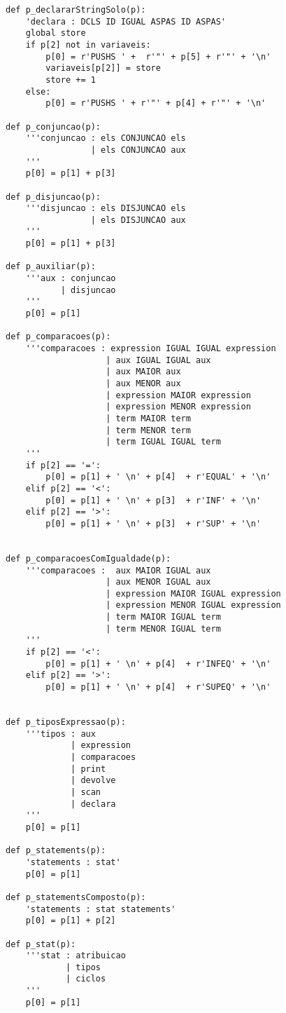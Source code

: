 \documentclass[11pt,a4paper]{report}%
\begin{document}
\begin{lstlisting}
def p_declararStringSolo(p): 
    'declara : DCLS ID IGUAL ASPAS ID ASPAS'
    global store
    if p[2] not in variaveis: 
        p[0] = r'PUSHS ' +  r'"' + p[5] + r'"' + '\n'
        variaveis[p[2]] = store
        store += 1
    else: 
        p[0] = r'PUSHS ' + r'"' + p[4] + r'"' + '\n'

def p_conjuncao(p): 
    '''conjuncao : els CONJUNCAO els
                 | els CONJUNCAO aux
    '''
    p[0] = p[1] + p[3]

def p_disjuncao(p): 
    '''disjuncao : els DISJUNCAO els
                 | els DISJUNCAO aux
    '''
    p[0] = p[1] + p[3]

def p_auxiliar(p):
    '''aux : conjuncao
           | disjuncao
    '''
    p[0] = p[1]

def p_comparacoes(p):
    '''comparacoes : expression IGUAL IGUAL expression
                    | aux IGUAL IGUAL aux
                    | aux MAIOR aux
                    | aux MENOR aux
                    | expression MAIOR expression
                    | expression MENOR expression
                    | term MAIOR term
                    | term MENOR term
                    | term IGUAL IGUAL term 
    '''
    if p[2] == '=':
        p[0] = p[1] + ' \n' + p[4]  + r'EQUAL' + '\n'
    elif p[2] == '<':
        p[0] = p[1] + ' \n' + p[3]  + r'INF' + '\n'
    elif p[2] == '>':
        p[0] = p[1] + ' \n' + p[3]  + r'SUP' + '\n'        
 

def p_comparacoesComIgualdade(p):
    '''comparacoes :  aux MAIOR IGUAL aux
                    | aux MENOR IGUAL aux
                    | expression MAIOR IGUAL expression
                    | expression MENOR IGUAL expression
                    | term MAIOR IGUAL term
                    | term MENOR IGUAL term
    '''
    if p[2] == '<':
        p[0] = p[1] + ' \n' + p[4]  + r'INFEQ' + '\n'
    elif p[2] == '>':
        p[0] = p[1] + ' \n' + p[4]  + r'SUPEQ' + '\n'        
 

def p_tiposExpressao(p): 
    '''tipos : aux
             | expression
             | comparacoes
             | print
             | devolve
             | scan
             | declara
    '''
    p[0] = p[1]

def p_statements(p): 
    'statements : stat'
    p[0] = p[1]

def p_statementsComposto(p):
    'statements : stat statements'
    p[0] = p[1] + p[2]       

def p_stat(p): 
    '''stat : atribuicao 
            | tipos
            | ciclos
    '''
    p[0] = p[1]


\end{lstlisting}
\end{document}
